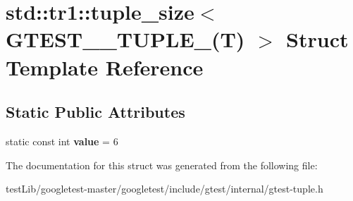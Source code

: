 \hypertarget{structstd_1_1tr1_1_1tuple__size_3_01GTEST__6__TUPLE___07T_08_01_4}{}\section{std\+:\+:tr1\+:\+:tuple\+\_\+size$<$ G\+T\+E\+S\+T\+\_\+\_\+\+T\+U\+P\+L\+E\+\_\+(T) $>$ Struct Template Reference}
\label{structstd_1_1tr1_1_1tuple__size_3_01GTEST__6__TUPLE___07T_08_01_4}
\subsection*{Static Public Attributes}
\begin{DoxyCompactItemize}
\item 
\mbox{\label{structstd_1_1tr1_1_1tuple__size_3_01GTEST__6__TUPLE___07T_08_01_4_a8c6740533d301f5d47f86ef5370a4b06}} 
static const int {\bfseries value} = 6
\end{DoxyCompactItemize}


The documentation for this struct was generated from the following file\+:\begin{DoxyCompactItemize}
\item 
test\+Lib/googletest-\/master/googletest/include/gtest/internal/gtest-\/tuple.\+h\end{DoxyCompactItemize}
